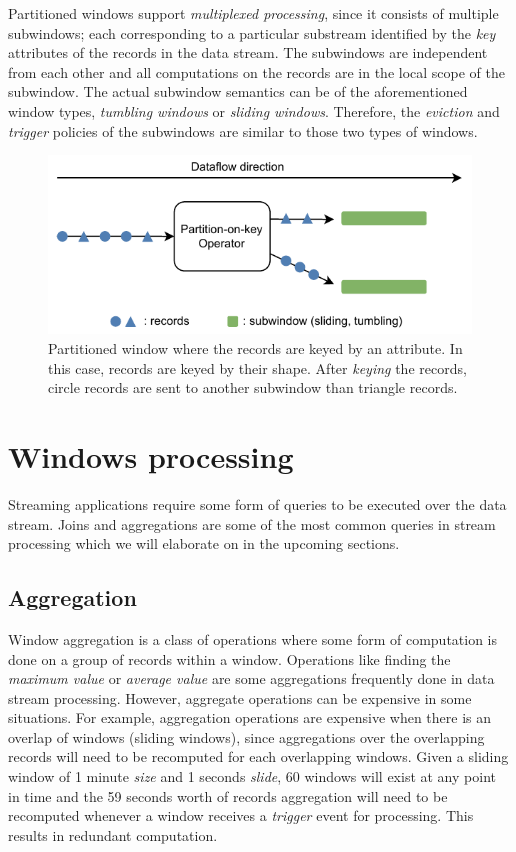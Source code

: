 Partitioned windows support \emph{multiplexed processing}, since it consists of  
multiple subwindows; each corresponding to a particular substream identified 
by the \emph{key} attributes of the records in the data stream. The subwindows 
are independent from each other and all computations on the records are in the local scope 
of the subwindow. The actual subwindow semantics can be of the aforementioned window types, \emph{tumbling windows} or \emph{sliding windows}. Therefore, the 
\emph{eviction} and \emph{trigger} policies of the subwindows 
are similar to those two types of windows. 


\begin{figure}[htpb]
    \centering
    \includegraphics[width=0.8\linewidth]{fig/partitioned_window.pdf}
    \caption{Partitioned window where the records are keyed by an attribute. In this case,
    records are keyed by their shape. After \emph{keying} the records, circle records are sent 
    to another subwindow than triangle records.}%
    \label{fig:partitioned_window}
\end{figure}
   

\section{Windows processing}
\label{sec:windows_processing}

Streaming applications require some form of queries to be executed over 
the data stream. Joins and aggregations are some of the most common queries 
in stream processing which we will elaborate on in the upcoming sections. 

\subsection{Aggregation}%
\label{sub:Aggregation}
Window aggregation is a class of operations where some form of computation 
is done on a group of records within a window. Operations like 
finding the \emph{maximum value} or \emph{average value} are some 
aggregations frequently done in data stream processing. However, 
aggregate operations can be expensive in some situations. 
For example, aggregation operations are expensive when there is 
an overlap of windows (sliding windows), since aggregations over the overlapping 
records will need to be recomputed for each overlapping windows. Given a sliding 
window of 1 minute \emph{size} and 1 seconds \emph{slide}, 60 windows will exist 
at any point in time and the 59 seconds worth of records aggregation will need 
to be recomputed whenever a window receives a \emph{trigger} event for processing. 
This results in redundant computation. 

